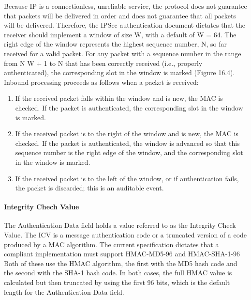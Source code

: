 \documentclass[12pt]{article}
\begin{document}
Because IP is a connectionless, unreliable service, the protocol does not guarantee that packets will be delivered in order and does not guarantee that all packets will be delivered. Therefore, the IPSec authentication document dictates that the receiver should implement a window of size W, with a default of W = 64. The right edge of the window represents the highest sequence number, N, so far received for a valid packet. For any packet with a sequence number in the range from N W + 1 to N that has been correctly received (i.e., properly authenticated), the corresponding slot in the window is marked (Figure 16.4). Inbound processing proceeds as follows when a packet is received:
\begin{enumerate}
\item
If the received packet falls within the window and is new, the MAC is checked. If the packet is authenticated, the corresponding slot in the window is marked.
\item
If the received packet is to the right of the window and is new, the MAC is checked. If the packet is authenticated, the window is advanced so that this sequence number is the right edge of the window, and the corresponding slot in the window is marked.
\item
If the received packet is to the left of the window, or if authentication fails, the packet is discarded; this is an auditable event.
\end{enumerate}

\paragraph*{Integrity Chech Value}
The Authentication Data field holds a value referred to as the Integrity Check Value. The ICV is a message authentication code or a truncated version of a code produced by a MAC algorithm. The current specification dictates that a compliant implementation must support HMAC-MD5-96 and HMAC-SHA-1-96
Both of these use the HMAC algorithm, the first with the MD5 hash code and the second with the SHA-1 hash code. In both cases, the full HMAC value is
calculated but then truncated by using the first 96 bits, which is the default length for the Authentication Data field.
\end{document}
